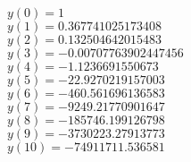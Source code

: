\documentclass[]{article}
\begin{document}
\begin{center}
$y(0) = 1$\\
$y(1) = 0.367741025173408$\\
$y(2) = 0.132504642015483$\\
$y(3) = -0.00707763902447456$\\
$y(4) = -1.1236691550673$\\
$y(5) = -22.9270219157003$\\
$y(6) = -460.561696136583$\\
$y(7) = -9249.21770901647$\\
$y(8) = -185746.199126798$\\
$y(9) = -3730223.27913773$\\
$y(10) = -74911711.536581$\\
\end{center}
\end{document}
